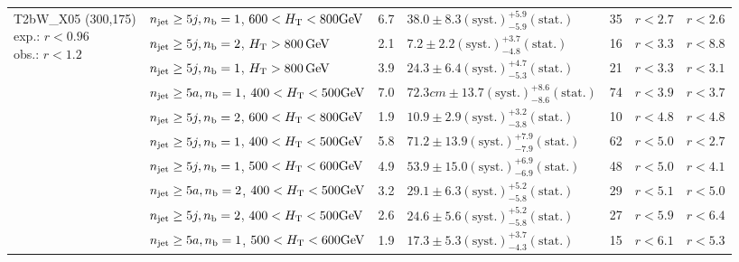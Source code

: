 \begin{table}[h!]
\begin{tabular}{ lllllll }
\multirow{10}{*}{\parbox[t]{2.3cm}{T2bW\_X05 (300,175)\\exp.: $r<0.96$\\obs.: $r<1.2$}}
 & $n_{\mathrm{jet}} \geq5j,n_{\text{b}} =1$, $600 < \mbox{$H_\text{T}$} < 800 \mathrm{GeV}$ & 6.7 & $38.0 \pm 8.3 \mathrm{(syst.)} ^{+5.9}_{-5.9} \mathrm{(stat.)}$ & 35 & $r < 2.7$ & $r < 2.6$\\ 
 & $n_{\mathrm{jet}} \geq5j,n_{\text{b}} =2$, $\mbox{$H_\text{T}$} > 800 \, \mathrm{GeV}$ & 2.1 & $7.2 \pm 2.2 \mathrm{(syst.)} ^{+3.7}_{-4.8} \mathrm{(stat.)}$ & 16 & $r < 3.3$ & $r < 8.8$\\ 
 & $n_{\mathrm{jet}} \geq5j,n_{\text{b}} =1$, $\mbox{$H_\text{T}$} > 800 \, \mathrm{GeV}$ & 3.9 & $24.3 \pm 6.4 \mathrm{(syst.)} ^{+4.7}_{-5.3} \mathrm{(stat.)}$ & 21 & $r < 3.3$ & $r < 3.1$\\ 
 & $n_{\mathrm{jet}} \geq5a,n_{\text{b}} =1$, $400 < \mbox{$H_\text{T}$} < 500 \mathrm{GeV}$ & 7.0 & $72.3cm \pm 13.7 \mathrm{(syst.)} ^{+8.6}_{-8.6} \mathrm{(stat.)}$ & 74 & $r < 3.9$ & $r < 3.7$\\ 
 & $n_{\mathrm{jet}} \geq5j,n_{\text{b}} =2$, $600 < \mbox{$H_\text{T}$} < 800 \mathrm{GeV}$ & 1.9 & $10.9 \pm 2.9 \mathrm{(syst.)} ^{+3.2}_{-3.8} \mathrm{(stat.)}$ & 10 & $r < 4.8$ & $r < 4.8$\\ 
 & $n_{\mathrm{jet}} \geq5j,n_{\text{b}} =1$, $400 < \mbox{$H_\text{T}$} < 500 \mathrm{GeV}$ & 5.8 & $71.2 \pm 13.9 \mathrm{(syst.)} ^{+7.9}_{-7.9} \mathrm{(stat.)}$ & 62 & $r < 5.0$ & $r < 2.7$\\ 
 & $n_{\mathrm{jet}} \geq5j,n_{\text{b}} =1$, $500 < \mbox{$H_\text{T}$} < 600 \mathrm{GeV}$ & 4.9 & $53.9 \pm 15.0 \mathrm{(syst.)} ^{+6.9}_{-6.9} \mathrm{(stat.)}$ & 48 & $r < 5.0$ & $r < 4.1$\\ 
 & $n_{\mathrm{jet}} \geq5a,n_{\text{b}} =2$, $400 < \mbox{$H_\text{T}$} < 500 \mathrm{GeV}$ & 3.2 & $29.1 \pm 6.3 \mathrm{(syst.)} ^{+5.2}_{-5.8} \mathrm{(stat.)}$ & 29 & $r < 5.1$ & $r < 5.0$\\ 
 & $n_{\mathrm{jet}} \geq5j,n_{\text{b}} =2$, $400 < \mbox{$H_\text{T}$} < 500 \mathrm{GeV}$ & 2.6 & $24.6 \pm 5.6 \mathrm{(syst.)} ^{+5.2}_{-5.8} \mathrm{(stat.)}$ & 27 & $r < 5.9$ & $r < 6.4$\\ 
 & $n_{\mathrm{jet}} \geq5a,n_{\text{b}} =1$, $500 < \mbox{$H_\text{T}$} < 600 \mathrm{GeV}$ & 1.9 & $17.3 \pm 5.3 \mathrm{(syst.)} ^{+3.7}_{-4.3} \mathrm{(stat.)}$ & 15 & $r < 6.1$ & $r < 5.3$\\ \hline
    \hline
  \end{tabular}
\end{table}

